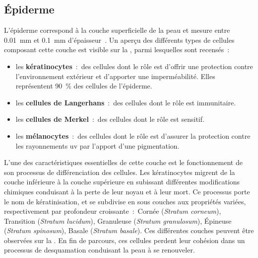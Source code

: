 \subsection{Épiderme}
L’épiderme correspond à la couche superficielle de la peau et mesure entre \SI{0,01}{\milli\metre} et \SI{0,1}{\milli\metre} d’épaisseur~\cite{SandbyMoller2003}. Un aperçu des différents types de cellules composant cette couche est visible sur la , parmi lesquelles sont recensés~:
\begin{itemize}
    \item les \textbf{kératinocytes}~:~des cellules dont le rôle est d'offrir une protection contre l'environnement extérieur et d'apporter une imperméabilité. Elles représentent 90~\% des cellules de l'épiderme.
    \item les \textbf{cellules de Langerhans}~:~des cellules dont le rôle est immunitaire.
    \item les \textbf{cellules de Merkel}~:~des cellules dont le rôle est sensitif.
    \item les \textbf{mélanocytes}~:~des cellules dont le rôle est d'assurer la protection contre les rayonnements \gls{uv} par l'apport d'une pigmentation.
\end{itemize}\par

L'une des caractéristiques essentielles de cette couche est le fonctionnement de son processus de différenciation des cellules. Les kératinocytes migrent de la couche inférieure à la couche supérieure en subissant différentes modifications chimiques conduisant à la perte de leur noyau et à leur mort. Ce processus porte le nom de kératinisation, et se subdivise en sous couches aux propriétés variées, respectivement par profondeur croissante~:~Cornée (\textit{Stratum corneum}), Transition (\textit{Stratum lucidum}), Granuleuse (\textit{Stratum granulosum}), Épineuse (\textit{Stratum spinosum}), Basale (\textit{Stratum basale}). Ces différentes couches peuvent être observées sur la . En fin de parcours, ces cellules perdent leur cohésion dans un processus de desquamation conduisant la peau à se renouveler.\par

